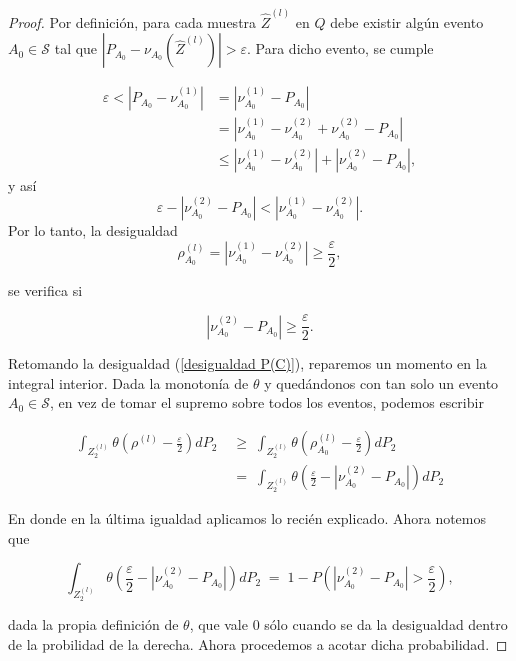 \documentclass{report}
\begin{document}
\begin{proof}
Por definición, para cada muestra $\hat{Z}^{(l)}$ en $Q$ debe existir algún evento $A_0\in\mathcal{S}$ tal que $|P_{A_0}-\nu_{A_0}\left(\hat{Z}^{(l)}\right)|>\varepsilon$.
Para dicho evento, se cumple

\[
\begin{aligned}
    \varepsilon < \left|P_{A_0}-\nu_{A_0}^{(1)}\right| &= \left|\nu_{A_0}^{(1)}-P_{A_0}\right|\\
    & = \left|\nu_{A_0}^{(1)}-\nu_{A_0}^{(2)}+\nu_{A_0}^{(2)}-P_{A_0}\right| \\
    & \leq \left|\nu_{A_0}^{(1)}-\nu_{A_0}^{(2)}\right|+\left|\nu_{A_0}^{(2)}-P_{A_0}\right|,
\end{aligned}
\]
y así
\[
    \varepsilon - \left|\nu_{A_0}^{(2)}-P_{A_0}\right| < \left|\nu_{A_0}^{(1)}-\nu_{A_0}^{(2)}\right|.
\]\newline
Por lo tanto, la desigualdad
\[
\rho_{A_0}^{(l)} = |\nu^{(1)}_{A_0}-\nu^{(2)}_{A_0}| \geq \frac{\varepsilon}{2},
\]

se verifica si 

\[
|\nu^{(2)}_{A_0}-P_{A_0}|\geq \frac{\varepsilon}{2}.
\]

Retomando la desigualdad (\ref{desigualdad P(C)}), reparemos un momento en la integral interior. 
Dada la monotonía de $\theta$ y quedándonos
con tan solo un evento $A_0\in\mathcal{S}$, en vez de tomar el supremo sobre todos los eventos, podemos escribir

\[
\begin{aligned}
\int_{ Z_2^{(l)}} \theta\left(\rho^{(l)}-\frac{\varepsilon}{2}\right) dP_2 \;&\geq\; \int_{ Z_2^{(l)}}  \theta\left(\rho^{(l)}_{A_0}-\frac{\varepsilon}{2}\right) dP_2 \\
& = \; \int_{ Z_2^{(l)}}  \theta\left(\frac{\varepsilon}{2} - |\nu^{(2)}_{A_0}-P_{A_0}|\right) dP_2
\end{aligned}
\]

En donde en la última igualdad aplicamos lo recién explicado. Ahora notemos que 

\begin{equation}\label{eq: theta como probabilidad}
    \int_{ Z_2^{(l)}}  \theta\left(\frac{\varepsilon}{2} - |\nu^{(2)}_{A_0}-P_{A_0}|\right) dP_2 \;=\; 1 - P\left(|\nu^{(2)}_{A_0}-P_{A_0}|>\frac{\varepsilon}{2}\right),
\end{equation}


dada la propia definición de $\theta$, que vale $0$ sólo cuando se da la desigualdad dentro de la probilidad de la derecha. Ahora procedemos a acotar dicha probabilidad.\newline


\end{proof}
\end{document}
